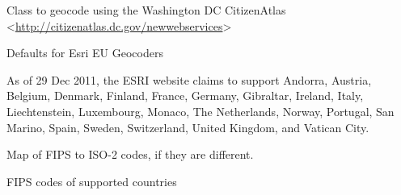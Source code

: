\documentclass[letterpaper,10pt,english]{sphinxmanual}
\begin{document}

\begin{fulllineitems}
\label{index:omgeo.services.CitizenAtlas}
Class to geocode using the Washington DC CitizenAtlas \textless{}\href{http://citizenatlas.dc.gov/newwebservices}{http://citizenatlas.dc.gov/newwebservices}\textgreater{}

\end{fulllineitems}


\begin{fulllineitems}
\label{index:omgeo.services.EsriEUGeocodeService}
Defaults for Esri EU Geocoders

As of 29 Dec 2011, the ESRI website claims to support Andorra, Austria, 
Belgium, Denmark, Finland, France, Germany, Gibraltar, Ireland, Italy,
Liechtenstein, Luxembourg, Monaco, The Netherlands, Norway, Portugal,
San Marino, Spain, Sweden, Switzerland, United Kingdom, and Vatican City.

\begin{fulllineitems}
\label{index:omgeo.services.EsriEUGeocodeService.MAP_FIPS_TO_ISO2}
Map of FIPS to ISO-2 codes, if they are different.

\end{fulllineitems}


\begin{fulllineitems}
\label{index:omgeo.services.EsriEUGeocodeService.SUPPORTED_COUNTRIES_FIPS}
FIPS codes of supported countries

\end{fulllineitems}


\end{fulllineitems}
\end{document}

